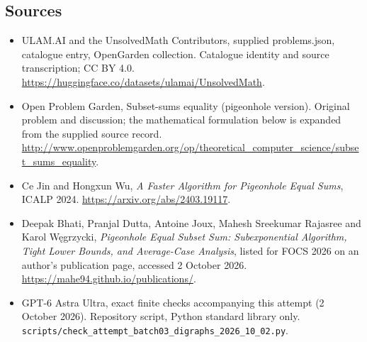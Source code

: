 \documentclass[11pt,a4paper]{article}
\begin{document}
\subsection{Sources}
\begin{itemize}
\item[S1] ULAM.AI and the UnsolvedMath Contributors, supplied problems.json, catalogue entry, OpenGarden collection. Catalogue identity and source transcription; CC BY 4.0.
\url{https://huggingface.co/datasets/ulamai/UnsolvedMath}.
\item[S2] Open Problem Garden, Subset-sums equality (pigeonhole version). Original problem and discussion; the mathematical formulation below is expanded from the supplied source record.
\url{http://www.openproblemgarden.org/op/theoretical_computer_science/subset_sums_equality}.
\item[S3] Ce Jin and Hongxun Wu, \emph{A Faster Algorithm for Pigeonhole Equal Sums}, ICALP 2024. \url{https://arxiv.org/abs/2403.19117}.
\item[S4] Deepak Bhati, Pranjal Dutta, Antoine Joux, Mahesh Sreekumar Rajasree and Karol W\k egrzycki, \emph{Pigeonhole Equal Subset Sum: Subexponential Algorithm, Tight Lower Bounds, and Average-Case Analysis}, listed for FOCS 2026 on an author's publication page, accessed 2 October 2026. \url{https://mahe94.github.io/publications/}.
\item[S9] GPT-6 Astra Ultra, exact finite checks accompanying this attempt (2 October 2026). Repository script, Python standard library only. \texttt{scripts/check\_attempt\_batch03\_digraphs\_2026\_10\_02.py}.
\end{itemize}
\end{document}

